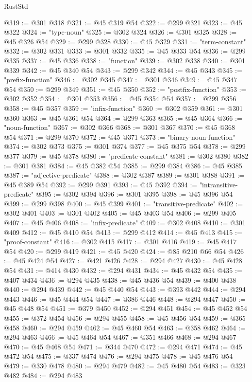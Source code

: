 \begin{lexlean}{RustStd}
\begin{coremodule}
@319 := @301 @318
@321 := @45 @319 @54
@322 := @299 @321
@323 := @45 @322
@324 := "type-noun"
@325 := @302 @324
@326 := @301 @325
@328 := @45 @326 @54
@329 := @299 @328
@330 := @45 @329
@331 := "term-constant"
@332 := @302 @331
@333 := @301 @332
@335 := @45 @333 @54
@336 := @299 @335
@337 := @45 @336
@338 := "function"
@339 := @302 @338
@340 := @301 @339
@342 := @45 @340 @54
@343 := @299 @342
@344 := @45 @343
@345 := "prefix-function"
@346 := @302 @345
@347 := @301 @346
@349 := @45 @347 @54
@350 := @299 @349
@351 := @45 @350
@352 := "postfix-function"
@353 := @302 @352
@354 := @301 @353
@356 := @45 @354 @54
@357 := @299 @356
@358 := @45 @357
@359 := "infix-function"
@360 := @302 @359
@361 := @301 @360
@363 := @45 @361 @54
@364 := @299 @363
@365 := @45 @364
@366 := "noun-function"
@367 := @302 @366
@368 := @301 @367
@370 := @45 @368 @54
@371 := @299 @370
@372 := @45 @371
@373 := "binary-noun-function"
@374 := @302 @373
@375 := @301 @374
@377 := @45 @375 @54
@378 := @299 @377
@379 := @45 @378
@380 := "predicate-constant"
@381 := @302 @380
@382 := @301 @381
@384 := @45 @382 @54
@385 := @299 @384
@386 := @45 @385
@387 := "adjective-predicate"
@388 := @302 @387
@389 := @301 @388
@391 := @45 @389 @54
@392 := @299 @391
@393 := @45 @392
@394 := "intransitive-predicate"
@395 := @302 @394
@396 := @301 @395
@398 := @45 @396 @54
@399 := @299 @398
@400 := @45 @399
@401 := "transitive-predicate"
@402 := @302 @401
@403 := @301 @402
@405 := @45 @403 @54
@406 := @299 @405
@407 := @45 @406
@408 := "infix-predicate"
@409 := @302 @408
@410 := @301 @409
@412 := @45 @410 @54
@413 := @299 @412
@414 := @45 @413
@415 := "proof-constant"
@416 := @302 @415
@417 := @301 @416
@419 := @45 @417 @54
@420 := @299 @419
@421 := @45 @420
@424 := @85 @210 @66 @54
@426 := @45 @424 @54
@427 := @421 @426
@428 := @294 @427
@430 := @45 @428 @54
@431 := @414 @430
@432 := @294 @431
@434 := @45 @432 @54
@435 := @407 @434
@436 := @294 @435
@438 := @45 @436 @54
@439 := @400 @438
@440 := @294 @439
@442 := @45 @440 @54
@443 := @393 @442
@444 := @294 @443
@446 := @45 @444 @54
@447 := @386 @446
@448 := @294 @447
@450 := @45 @448 @54
@451 := @379 @450
@452 := @294 @451
@454 := @45 @452 @54
@455 := @372 @454
@456 := @294 @455
@458 := @45 @456 @54
@459 := @365 @458
@460 := @294 @459
@462 := @45 @460 @54
@463 := @358 @462
@464 := @294 @463
@466 := @45 @464 @54
@467 := @351 @466
@468 := @294 @467
@470 := @45 @468 @54
@471 := @344 @470
@472 := @294 @471
@474 := @45 @472 @54
@475 := @337 @474
@476 := @294 @475
@478 := @45 @476 @54
@479 := @330 @478
@480 := @294 @479
@482 := @45 @480 @54
@483 := @323 @482
@484 := @294 @483

\end{coremodule}
\end{lexlean}
